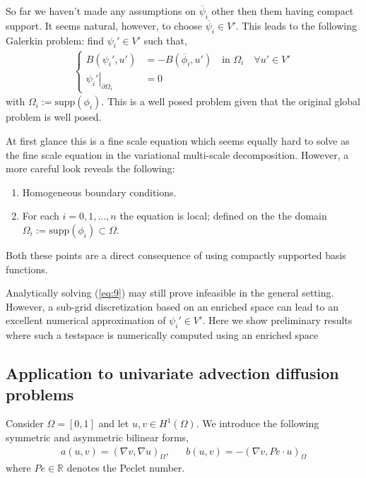 So far we haven't made any assumptions on $\overline{\psi}_i $ other then them having compact support. It seems natural, however, to choose $\overline{\psi}_i \in V'$. This leads to the following Galerkin problem: find $\psi_i' \in V'$ such that,
\begin{align}
	\begin{cases} B(\psi_i ' , u') &= - B(\overline{\phi}_i, u') \quad \text{in } \Omega_i \quad \forall u' \in V' \\
	\left. \psi_i' \right|_{\partial \Omega_i} &= 0
	\end{cases}
	\label{eq:9}
\end{align} 
with $\Omega_i:=\mathrm{supp} \left(  \phi_i \right)$. This is a well posed problem given that the original global problem is well posed.
\begin{remark}
	At first glance this is a fine scale equation which seems equally hard to solve as the fine scale equation in the variational multi-scale decomposition. However, a more careful look reveals the following: 
	\begin{enumerate}
		\item Homogeneous boundary conditions.
		\item For each $i=0,1,...,n$ the equation is local; defined on the the domain $\Omega_i:=\mathrm{supp} \left(  \phi_i \right) \subset \Omega$.
	\end{enumerate}
	Both these points are a direct consequence of using compactly supported basis functions.
\end{remark}

Analytically solving (\ref{eq:9}) may still prove infeasible in the general setting. However, a sub-grid discretization based on an enriched space can lead to an excellent numerical approximation of $\psi_i' \in V'$. Here we show preliminary results where such a testspace is numerically computed using an enriched space


\subsection{Application to univariate advection diffusion problems}
Consider $\Omega = [0,1] $ and let $u,v \in H^1(\Omega)$. We introduce the following symmetric and asymmetric  bilinear forms,
\begin{align}
	& a(u,v) =  \left( \nabla v, \nabla u   \right)_{\Omega}, &
	& b(u,v) = -\left( \nabla v, Pe \cdot u   \right)_{\Omega} & 
\end{align}
where $Pe \in \mathbb{R}$ denotes the Peclet number.

